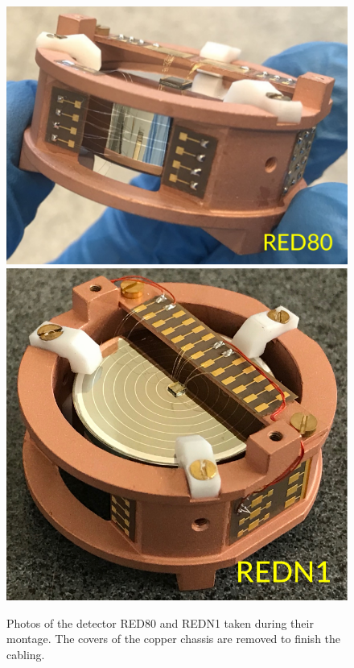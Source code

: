 \begin{figure}
\centering
\includegraphics[align=c, scale=0.5]{Figures/ElectrodesExperimental/photo_red80_v2.pdf}
\includegraphics[align=c, scale=0.5]{Figures/ElectrodesExperimental/photo_redn1_v2.pdf}
\caption{Photos of the detector RED80 and REDN1 taken during their montage. The covers of the copper chassis are removed to finish the cabling.}
\label{fig:photo-redn1-red80}
\end{figure}

